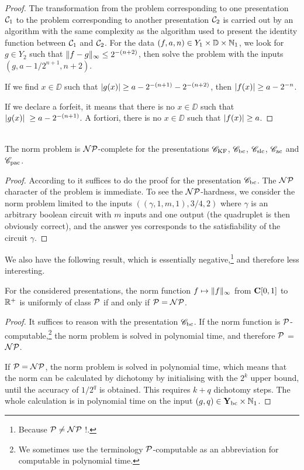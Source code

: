 \begin{proof}
The transformation from the problem corresponding to one presentation ${{\cal C}}_1$ to the problem corresponding to another presentation ${{\cal C}}_2$ is carried out by an algorithm with the same complexity as the algorithm used to present the identity function between ${{\cal C}}_1$ and ${{\cal C}}_2$. For the data $(f,a,n) \in Y_1 \times \mathbb {D} \times \mathbb {N}_1$, we look for $g \in Y_2$ such that $\lVert  f-g  \rVert_{\infty} \leq 2^{-(n+2)}$, then solve the problem with the inputs $(g,a-1/2^{n+1}, n+2)$. 

\noindent 
If we find $x \in \DD$ such that $\left|{g(x)}\right|  \geq a - 2^{-(n+1)}- 2^{-(n+2)}$, then $\left|{f(x)}\right|  \geq a - 2^{-n}$. 

\noindent 
If we declare a forfeit, it means that there is no $x \in \DD$ such that $\left|{g(x)}\right|\;  \geq a - 2^{-(n+1)}$. 
A fortiori, there is no $x \in \DD$ such that $\left|{f(x)}\right| \geq a$. 
\end{proof}



\begin{theorem} \label{433}~\\
The norm problem is ${\cal NP}$-complete for the presentations ${{{\mathscr C}}_{\rm KF}}$, ${{{\mathscr C}}_{\rm bc}}$, ${{{\mathscr C}}_{\rm slc}}$, ${{{\mathscr C}}_{\rm ac}}$ and ${{{\mathscr C}}_{\rm pac}}$.
\end{theorem}
%
\begin{proof}
According to  it suffices to do the proof for the presentation ${{{\mathscr C}}_{\rm bc}}$. 
The ${\cal NP}$ character of the problem is immediate. 
To see the ${\cal NP}$-hardness, we consider the norm problem limited to the inputs $((\gamma,1,m,1), 3/4, 2)$ where $\gamma$ is an arbitrary boolean circuit with $m$ inputs and one output (the quadruplet is then obviously correct), and the answer yes corresponds to the satisfiability of the  circuit $\gamma$.
\end{proof}
%

We also have the following result, which is essentially negative,\footnote{Because ${\cal P} \neq {\cal NP}$ !.} and therefore less interesting.

\begin{proposition} \label{434}
For the considered presentations, the norm function $f \mapsto \lVert f \rVert_{\infty}$ from ${{\bf C}[0,1]}$ to $\mathbb {R}^{+}$ is uniformly of class ${\cal P}$ if and only if ${\cal P} = {\cal NP}$.
\end{proposition}
%
\begin{proof}
It suffices to reason with the presentation ${{{\mathscr C}}_{\rm bc}}$. If the norm function is ${\cal P}$-computable,\footnote{We sometimes use the terminology ${\cal P}$-computable as an abbreviation for computable in polynomial time.} the norm problem is solved in polynomial time, and therefore ${\cal P}$ = ${\cal NP}$.

\noindent 
If ${\cal P} = {\cal NP}$, the norm problem is solved in polynomial time, which means that the norm can be calculated by dichotomy by initialising with the $2^k$ upper bound, until the accuracy of $1/2^q$ is obtained. This requires $k+q$ dichotomy steps. 
The whole calculation is in polynomial time on the input $(g,q) \in {{\bf Y}_{\rm bc}} \times \mathbb {N}_1$. 
\end{proof}

